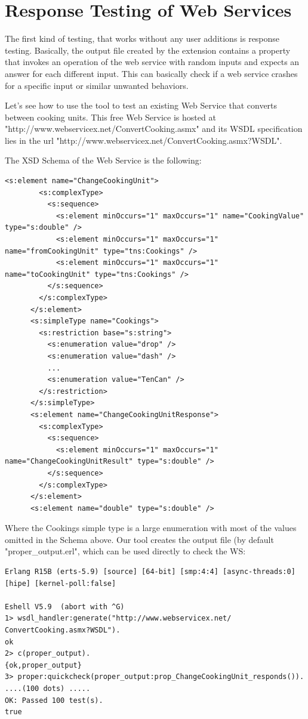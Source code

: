 \documentclass[submission,copyright,a4]{eptcs}
\begin{document}
\section{Response Testing of Web Services}

The first kind of testing, that works without any user additions is response testing. Basically, the output file created by the extension contains a property that invokes an operation of the web service with random inputs and expects an answer for each different input. This can basically check if a web service crashes for a specific input or similar unwanted behaviors. 

Let's see how to use the tool to test an existing Web Service that converts between cooking units. This free Web Service is hosted at "http://www.webservicex.net/ConvertCooking.asmx" and its WSDL specification lies in the url "http://www.webservicex.net/ConvertCooking.asmx?WSDL". 

The XSD Schema of the Web Service is the following:

\begin{lstlisting}
<s:element name="ChangeCookingUnit">
        <s:complexType>
          <s:sequence>
            <s:element minOccurs="1" maxOccurs="1" name="CookingValue" type="s:double" />
            <s:element minOccurs="1" maxOccurs="1" name="fromCookingUnit" type="tns:Cookings" />
            <s:element minOccurs="1" maxOccurs="1" name="toCookingUnit" type="tns:Cookings" />
          </s:sequence>
        </s:complexType>
      </s:element>
      <s:simpleType name="Cookings">
        <s:restriction base="s:string">
          <s:enumeration value="drop" />
          <s:enumeration value="dash" />
          ...
          <s:enumeration value="TenCan" />
        </s:restriction>
      </s:simpleType>
      <s:element name="ChangeCookingUnitResponse">
        <s:complexType>
          <s:sequence>
            <s:element minOccurs="1" maxOccurs="1" name="ChangeCookingUnitResult" type="s:double" />
          </s:sequence>
        </s:complexType>
      </s:element>
      <s:element name="double" type="s:double" />
\end{lstlisting}

Where the Cookings simple type is a large enumeration with most of the values omitted in the Schema above. Our tool creates the output file (by default "proper\_output.erl", which can be used directly to check the WS:

\begin{lstlisting}
Erlang R15B (erts-5.9) [source] [64-bit] [smp:4:4] [async-threads:0] [hipe] [kernel-poll:false]

Eshell V5.9  (abort with ^G)
1> wsdl_handler:generate("http://www.webservicex.net/
ConvertCooking.asmx?WSDL").
ok
2> c(proper_output).
{ok,proper_output}
3> proper:quickcheck(proper_output:prop_ChangeCookingUnit_responds()).
....(100 dots) .....
OK: Passed 100 test(s).
true
\end{lstlisting}
\end{document}
